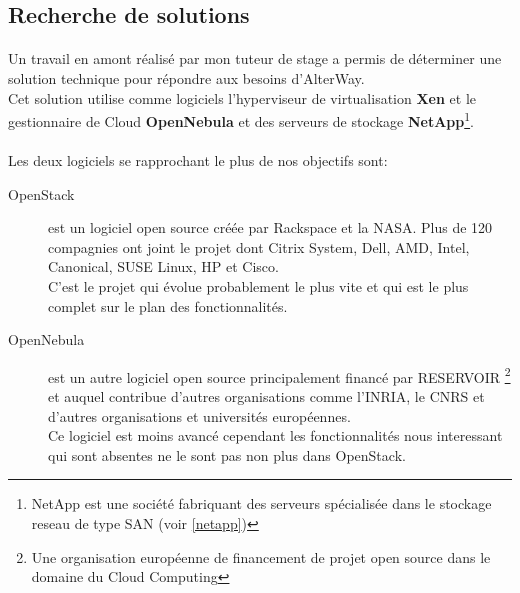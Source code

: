 \subsection{Recherche de solutions}
\paragraph*{}
Un travail en amont réalisé par mon tuteur de stage a permis de déterminer une solution technique pour répondre aux besoins d'AlterWay.\\
Cet solution utilise comme logiciels l'hyperviseur de virtualisation \textbf{Xen} et le gestionnaire de Cloud \textbf{OpenNebula} et des
serveurs de stockage \textbf{NetApp}\footnote{NetApp est une société fabriquant des serveurs spécialisée dans le stockage reseau de type SAN (voir \ref{netapp})}.


\paragraph*{}
Les deux logiciels se rapprochant le plus de nos objectifs sont:
\begin{description}
	\item[OpenStack]  est un logiciel open source créée par Rackspace et la NASA. Plus de 120 compagnies ont joint le projet dont Citrix System, Dell, AMD, Intel,
		Canonical, SUSE Linux, HP et Cisco.\\
		C'est le projet qui évolue probablement le plus vite et qui est le plus complet sur le plan des fonctionnalités.
	\item[OpenNebula]  est un autre logiciel open source principalement financé par RESERVOIR
	\footnote{Une organisation européenne de financement de projet open source dans le domaine du Cloud Computing} et auquel contribue d'autres organisations
	comme l'INRIA, le CNRS et d'autres organisations et universités européennes.\\
	Ce logiciel est moins avancé cependant les fonctionnalités nous interessant qui sont absentes ne le sont pas non plus dans OpenStack.
\end{description}


